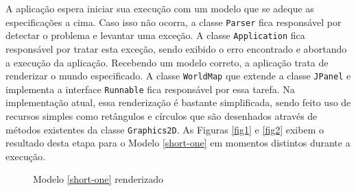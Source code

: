 A aplicação espera iniciar sua execução com um modelo que se adeque as
especificações a cima. Caso isso não ocorra, a classe \verb!Parser!
fica responsável por detectar o problema e levantar uma exceção. A
classe \verb!Application! fica responsável por tratar esta exceção,
sendo exibido o erro encontrado e abortando a execução da aplicação.
Recebendo um modelo correto, a aplicação trata de renderizar o mundo
especificado. A classe \verb!WorldMap! que extende a classe
\verb!JPanel! e implementa a interface \verb!Runnable! fica
responsável por essa tarefa. Na implementação atual, essa renderização
é bastante simplificada, sendo feito uso de recursos simples como
retângulos e círculos que são desenhados através de métodos existentes
da classe \verb!Graphics2D!. As Figuras \ref{fig1} e \ref{fig2} exibem
o resultado desta etapa para o Modelo \ref{short-one} em momentos
distintos durante a execução.
\begin{figure}[ht!]
  \centering
  \caption{Modelo \ref{short-one} renderizado}
\end{figure}

